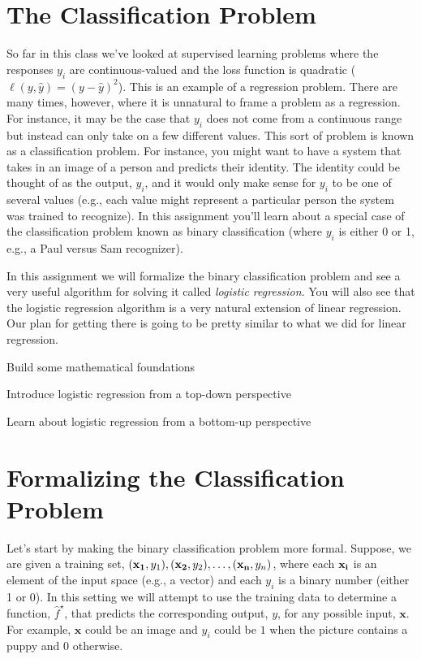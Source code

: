 \documentclass[assignment03_Solutions]{subfiles}
\begin{document}
\section{The Classification Problem}

So far in this class we've looked at supervised learning problems where the responses $y_i$ are continuous-valued and the loss function is quadratic ($\ell(y, \hat{y}) = (y-\hat{y})^2$).  This is an example of a regression problem.  There are many times, however, where it is unnatural to frame a problem as a regression.  For instance, it may be the case that $y_i$ does not come from a continuous range but instead can only take on a few different values.  This sort of problem is known as a classification problem.  For instance, you might want to have a system that takes in an image of a person and predicts their identity.  The identity could be thought of as the output, $y_i$, and it would only make sense for $y_i$ to be one of several values (e.g., each value might represent a particular person the system was trained to recognize).  In this assignment you'll learn about a special case of the classification problem known as binary classification (where $y_i$ is either 0 or 1, e.g., a Paul versus Sam recognizer).

In this assignment we will formalize the binary classification problem and see a very useful algorithm for solving it called \emph{logistic regression}.  You will also see that the logistic regression algorithm is a very natural extension of linear regression.  Our plan for getting there is going to be pretty similar to what we did for linear regression.
\bi
\item Build some mathematical foundations
\item Introduce logistic regression from a top-down perspective
\item Learn about logistic regression from a bottom-up perspective
\ei

\section{Formalizing the Classification Problem}
Let's start by making the binary classification problem more formal.  Suppose, we are given a training set, $(\mathbf{x_1}, y_1), (\mathbf{x_2}, y_2), \ldots, (\mathbf{x_n}, y_n)$, where each $\mathbf{x_i}$ is an element of the input space (e.g., a vector) and each $y_i$ is a binary number (either 1 or 0).  In this setting we will attempt to use the training data to determine a function, $\hat{f}^\star$, that predicts the corresponding output, $y$, for any possible input, $\mathbf{x}$.  For example,  $\mathbf{x}$ could be an image and $y_i$ could be $1$ when the picture contains a puppy and $0$ otherwise.
\end{document}
